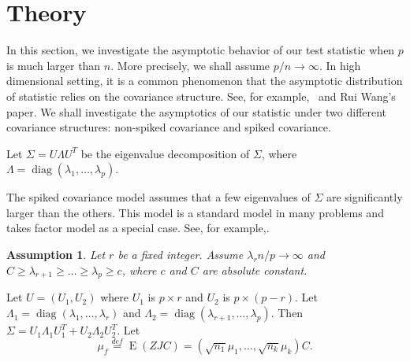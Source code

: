 \documentclass[review]{elsarticle}
\DeclareMathOperator{\mytr}{tr}
\DeclareMathOperator{\mydiag}{diag}
\DeclareMathOperator{\myE}{E}
\theoremstyle{plain}
\newtheorem{assumption}{\quad\quad Assumption}
\theoremstyle{definition}
\theoremstyle{remark}
\begin{document}
   
   
   










\section{Theory}
In this section, we investigate the asymptotic behavior of our test statistic when $p$ is much larger than $n$.
More precisely, we shall assume $p/n\to\infty$.
In high dimensional setting, it is a common phenomenon that the asymptotic distribution of statistic relies on the covariance structure.
See, for example,~\cite{Ma2015A} and Rui Wang's paper.
We shall investigate the asymptotics of our statistic under two different covariance structures: non-spiked covariance and spiked covariance.




Let $\Sigma= U\Lambda U^T$ be the eigenvalue decomposition of $\Sigma$, where $\Lambda =\mydiag (\lambda_1,\ldots,\lambda_p)$.


The spiked covariance model assumes that a few eigenvalues of $\Sigma$ are significantly larger than the others. This model is a standard model in many problems and takes factor model as a special case.
See, for example,.

\begin{assumption}\label{assumpEigen}
    Let $r$ be a fixed integer.
    Assume ${\lambda_r n}/{p}\to \infty$ and $C \geq \lambda_{r+1} \geq \ldots \geq \lambda_{p} \geq c$, where $c$ and $C$ are absolute constant.
\end{assumption}
Let $U=(U_1,U_2)$ where $U_1$ is $p\times r$ and $U_2$ is $p\times (p-r)$. Let $\Lambda_1=\mydiag(\lambda_1,\ldots,\lambda_r)$ and $\Lambda_2=\mydiag(\lambda_{r+1},\ldots,\lambda_p)$.
Then $\Sigma=U_1\Lambda_1 U_1^T+U_2\Lambda_2 U_2^T$.
Let
$$
\mu_{f}\overset{def}{=}
\myE (ZJC) =(\sqrt{n_1}\mu_1,\ldots,\sqrt{n_k}\mu_k) C.
$$
\end{document}
